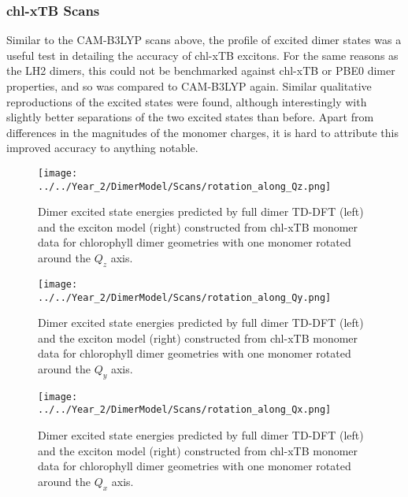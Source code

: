 \subsubsection{chl-xTB Scans}
\label{subsubsec:chl_xtb_scans}

Similar to the CAM-B3LYP scans above, the profile of excited dimer states was a useful
test in detailing the accuracy of chl-xTB excitons. For the same reasons as the
LH2 dimers, this could not be benchmarked against chl-xTB or PBE0 dimer properties,
and so was compared to CAM-B3LYP again. Similar qualitative reproductions of the
excited states were found, although interestingly with slightly better separations
of the two excited states than before. Apart from differences in the magnitudes 
of the monomer charges, it is hard to attribute this improved accuracy to anything
notable.

\begin{figure}
    \centering
    \texttt{[image: ../../Year\_2/DimerModel/Scans/rotation\_along\_Qz.png]}
    \label{fig:chl_xtb_rot_Qz}
    \caption{Dimer excited state energies predicted by full dimer TD-DFT (left)
    and the exciton model (right) constructed from chl-xTB monomer data for chlorophyll 
    dimer geometries with one monomer rotated around the $Q_z$ axis.}
\end{figure}

\begin{figure}
    \centering
    \texttt{[image: ../../Year\_2/DimerModel/Scans/rotation\_along\_Qy.png]}
    \label{fig:chl_xtb_rot_Qy}
    \caption{Dimer excited state energies predicted by full dimer TD-DFT (left)
    and the exciton model (right) constructed from chl-xTB monomer data for chlorophyll 
    dimer geometries with one monomer rotated around the $Q_y$ axis.}
\end{figure}

\begin{figure}
    \centering
    \texttt{[image: ../../Year\_2/DimerModel/Scans/rotation\_along\_Qx.png]}
    \label{fig:chl_xtb_rot_Qx}
    \caption{Dimer excited state energies predicted by full dimer TD-DFT (left)
    and the exciton model (right) constructed from chl-xTB monomer data for chlorophyll 
    dimer geometries with one monomer rotated around the $Q_x$ axis.}
\end{figure}

